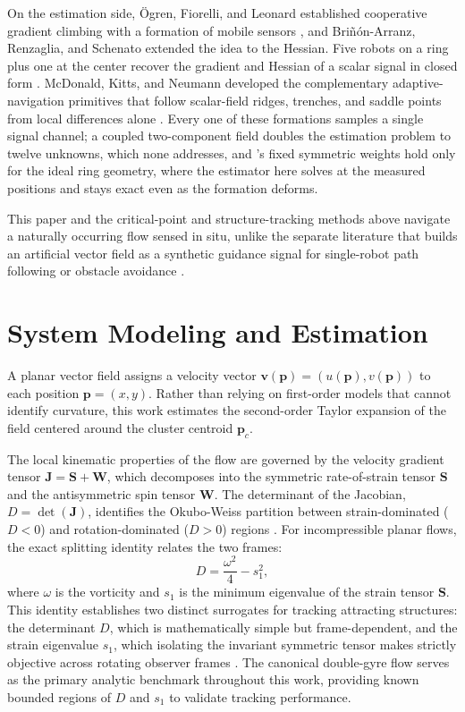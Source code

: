 \documentclass[lettersize,journal]{IEEEtran}
\begin{document}
On the estimation side, \"{O}gren, Fiorelli, and Leonard established
cooperative gradient climbing with a formation of mobile sensors
\cite{2}, and Bri\~{n}\'{o}n-Arranz, Renzaglia, and Schenato extended
the idea to the Hessian. Five robots on a ring plus one at the center
recover the gradient and Hessian of a scalar signal in closed form
\cite{6}. McDonald, Kitts, and Neumann developed the complementary
adaptive-navigation primitives that follow scalar-field ridges,
trenches, and saddle points from local differences alone
\cite{3,4,5}. Every one of these formations samples a single signal
channel; a coupled two-component field doubles the estimation problem
to twelve unknowns, which none addresses, and \cite{6}'s fixed
symmetric weights hold only for the ideal ring geometry, where the
estimator here solves at the measured positions and stays exact even
as the formation deforms.

This paper and the critical-point and structure-tracking methods above
\cite{9,17,18,19,20,21} navigate a naturally occurring flow sensed in
situ, unlike the separate literature that builds an artificial vector
field as a synthetic guidance signal for single-robot path following
\cite{33} or obstacle avoidance \cite{34}.

\section{System Modeling and Estimation}
\label{sec:system_modeling}

A planar vector field assigns a velocity vector $\mathbf{v}(\mathbf{p}) = (u(\mathbf{p}), v(\mathbf{p}))$ to each position $\mathbf{p} = (x, y)$. Rather than relying on first-order models that cannot identify curvature, this work estimates the second-order Taylor expansion of the field centered around the cluster centroid $\mathbf{p}_c$. 

The local kinematic properties of the flow are governed by the velocity gradient tensor $\mathbf{J} = \mathbf{S} + \mathbf{W}$, which decomposes into the symmetric rate-of-strain tensor $\mathbf{S}$ and the antisymmetric spin tensor $\mathbf{W}$. The determinant of the Jacobian, $D = \det(\mathbf{J})$, identifies the Okubo-Weiss partition between strain-dominated ($D < 0$) and rotation-dominated ($D > 0$) regions \cite{28,29}. For incompressible planar flows, the exact splitting identity relates the two frames:
\begin{equation}
    D = \frac{\omega^2}{4} - s_1^2,
    \label{eq:splitting}
\end{equation}
where $\omega$ is the vorticity and $s_1$ is the minimum eigenvalue of the strain tensor $\mathbf{S}$. This identity establishes two distinct surrogates for tracking attracting structures: the determinant $D$, which is mathematically simple but frame-dependent, and the strain eigenvalue $s_1$, which isolating the invariant symmetric tensor makes strictly objective across rotating observer frames \cite{24}. The canonical double-gyre flow \cite{15} serves as the primary analytic benchmark throughout this work, providing known bounded regions of $D$ and $s_1$ to validate tracking performance.
\end{document}
